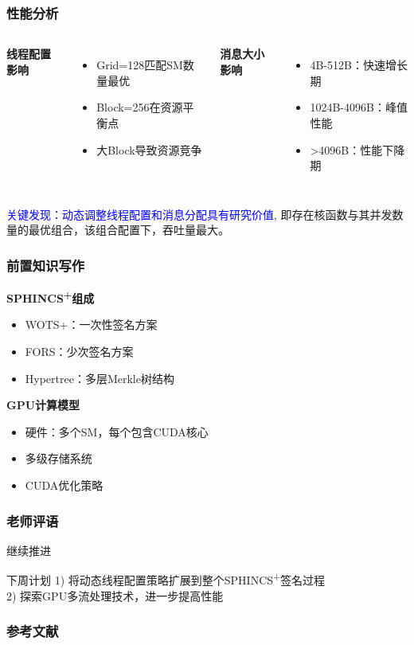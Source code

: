 \documentclass[slide]{../../custom}
\begin{document}
\begin{frame}
  \frametitle{性能分析}
  \begin{columns}
    \textbf{线程配置影响}
    \begin{itemize}
      \item Grid=128匹配SM数量最优
      \item Block=256在资源平衡点
      \item 大Block导致资源竞争
    \end{itemize}

    \textbf{消息大小影响}
    \begin{itemize}
      \item 4B-512B：快速增长期
      \item 1024B-4096B：峰值性能
      \item >4096B：性能下降期
    \end{itemize}
  \end{columns}

  \vspace{0.5cm}
  \textcolor{blue}{关键发现：动态调整线程配置和消息分配具有研究价值}, 即存在核函数与其并发数量的最优组合，该组合配置下，吞吐量最大。 \\
\end{frame}

\begin{frame}
  \frametitle{前置知识写作}
  \textbf{SPHINCS\textsuperscript{+}组成}
  \begin{itemize}
    \item WOTS+：一次性签名方案
    \item FORS：少次签名方案
    \item Hypertree：多层Merkle树结构
  \end{itemize}

  \vspace{0.3cm}
  \textbf{GPU计算模型}
  \begin{itemize}
    \item 硬件：多个SM，每个包含CUDA核心
    \item 多级存储系统
    \item CUDA优化策略
  \end{itemize}
\end{frame}

\begin{frame}
  \frametitle{老师评语}
  \begin{alertblock}{继续推进}
  \end{alertblock}
  \begin{block}{下周计划}
  1) 将动态线程配置策略扩展到整个SPHINCS\textsuperscript{+}签名过程 \\
2) 探索GPU多流处理技术，进一步提高性能
\end{block}
\end{frame}

\begin{frame}
\frametitle{参考文献}


\end{frame}
\end{document}
